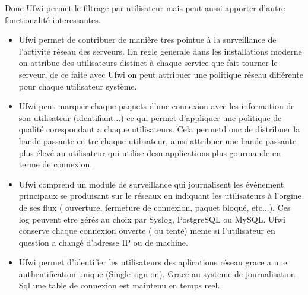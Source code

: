 \documentclass[12pt]{report}
\begin{document}
\newpage
Donc Ufwi permet le filtrage par utilisateur mais peut aussi apporter d'autre fonctionalité interessantes.\newline
\begin{itemize}
    \item Ufwi permet de contribuer de manière tres pointue à la surveillance de l'activité réseau des serveurs. En regle generale dans les installations moderne on attribue des utilisateurs distinct à chaque service que fait tourner le serveur, de ce faite avec Ufwi on peut attribuer une politique réseau différente pour chaque utilisateur système.\newline
    \item Ufwi peut marquer chaque paquets d'une connexion avec les information de son utilisateur (identifiant...) ce qui permet d'appliquer une politique de qualité corespondant a chaque utilisateurs. Cela permetd onc de distribuer la bande passante en tre chaque utilisateur, ainsi attribuer une bande passante plus élevé au utilisateur qui utilise desn applications plus gourmande en terme de connexion.\newline
    \item Ufwi comprend un module de surveillance qui journalisent les événement principaux se produisant sur le réseaux en indiquant les utilisateurs à l'orgine de ses flux ( ouverture, fermeture de connexion, paquet bloqué, etc...). Ces log peuvent etre gérés au choix par Syslog, PostgreSQL ou MySQL. Ufwi conserve chaque connexion ouverte ( ou tenté) meme si l'utilisateur en question a changé d'adresse IP ou de machine.\newline
    \item Ufwi permet d'identifier les utilisateurs des aplications réseau grace a une authentification unique (Single sign on). Grace au systeme de journalisation Sql une table de connexion est maintenu en temps reel.  

\end{itemize}
\end{document}
